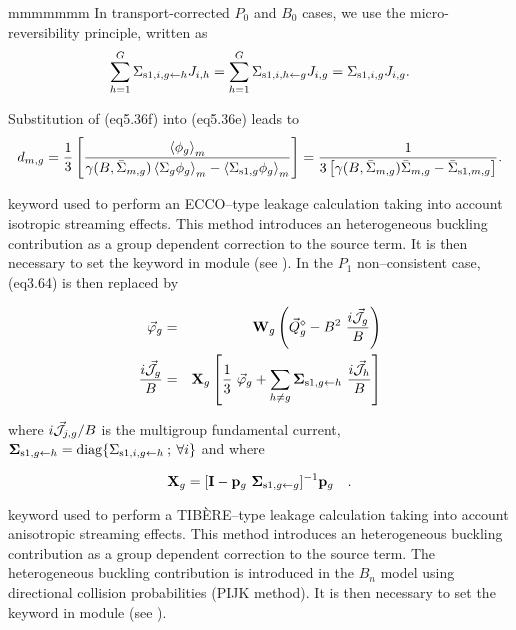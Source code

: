 \begin{ListeDeDescription}{mmmmmmm}
In transport-corrected $P_0$ and $B_0$ cases, we use the micro-reversibility principle, written as
\begin{equation}
\sum_{h=1}^G \Sigma_{{\rm s1},i,g \leftarrow h} J_{i,h} =\sum_{h=1}^G \Sigma_{{\rm s1},i,h \leftarrow g} J_{i,g}=\Sigma_{{\rm s1},i,g} J_{i,g} .
\label{eq:eq5.36f}
\end{equation}

Substitution of \eq(eq5.36f) into \eq(eq5.36e) leads to
\begin{equation}
d_{m,g} = {1\over 3}\left[ {\left<\phi_g\right>_m\over \gamma(B,\bar\Sigma_{m,g})\left<\Sigma_g\phi_g\right>_m-\left<\Sigma_{{\rm s1},g}\phi_g\right>_m}\right]=
{1\over 3\left[\gamma(B,\bar\Sigma_{m,g})\bar\Sigma_{m,g}-\bar\Sigma_{{\rm s1},m,g}\right]} .
\label{eq:eq5.36c}
\end{equation}

\item[\moc{ECCO}] keyword used to perform an ECCO--type leakage
calculation taking into account isotropic streaming effects. This method
introduces an heterogeneous buckling contribution as a group dependent correction
to the source term.\cite{ecco,rimpault} It is then necessary to set the keyword 
in module  (see ). In the $P_1$ non--consistent case,
\eq(eq3.64) is then replaced by

\vskip -0.3cm

\begin{eqnarray}
\vec\varphi_g&=& {\bf W}_g \left(\vec Q^\diamond_g - B^2 \ {i\vec{\cal J}_g\over B}\right)
\label{eq:eq5.37flux} \\
{i\vec{\cal J}_g\over B} &=& {\bf X}_g \left[{1 \over 3}
\ \vec\varphi_g + \sum_{h\not= g} {\bf \Sigma}_{{\rm s1},g \gets h} \
{i\vec{\cal J}_h\over B} \right]
\label{eq:eq5.37cour}
\end{eqnarray}

\noindent where $i\vec{\cal J}_{j,g}/B$ is the multigroup fundamental current, ${\bf \Sigma}_{{\rm s1},g \gets h}={\rm diag}\{ \Sigma_{{\rm s1},i,g \gets h}\> ;\> \forall i \}$ and where

\begin{equation}
{\bf X}_g=[{\bf I}-{\bf p}_g \ {\bf\Sigma}_{{\rm s}1,g\gets g}]^{-1} {\bf p}_g \ \ \ .
\label{eq:eq5.37ter}
\end{equation}

\item[\moc{TIBERE}] keyword used to perform a TIB\`ERE--type leakage
calculation taking into account anisotropic streaming effects. This method
introduces an heterogeneous buckling contribution as a group dependent correction
to the source term.\cite{PIJK0,PIJK} The heterogeneous buckling contribution is
introduced in the $B_n$ model using directional collision probabilities (PIJK method).
It is then necessary to set the keyword
 in module  (see ).


\end{ListeDeDescription}
